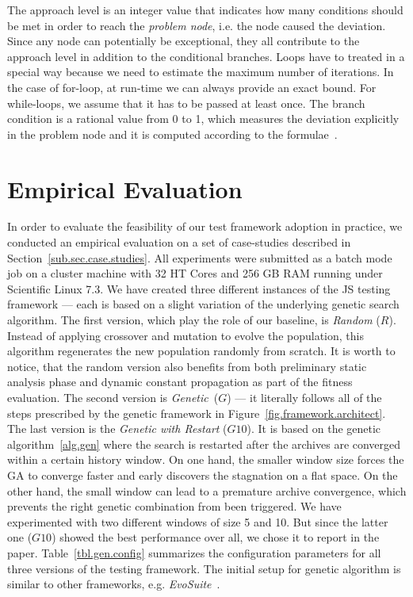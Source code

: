 \documentclass[sigconf]{acmart}
\begin{document}
The approach level is an integer value that indicates how many conditions should be met in order to reach the \emph{problem node}, i.e. the node caused the deviation. Since any node can potentially be exceptional, they all contribute to the approach level in addition to the conditional branches. Loops have to treated in a special way because we need to estimate the maximum number of iterations. In the case of for-loop, at run-time we can always provide an exact bound. For while-loops, we assume that it has to be passed at least once. The branch condition is a rational value from 0 to 1, which measures the deviation explicitly in the problem node and it is computed according to the formulae~\cite{tracey1998automated}.
 
\section{Empirical Evaluation}
\label{sec.evaluation}

In order to evaluate the feasibility of our test framework adoption in practice, we conducted an empirical evaluation on a set of case-studies described in Section~\ref{sub.sec.case.studies}. All experiments were submitted as a batch mode job on a cluster machine with 32 HT Cores and 256 GB RAM running under Scientific Linux 7.3. We have created three different instances of the JS testing framework --- each is based on a slight variation of the underlying genetic search algorithm. The first version, which play the role of our baseline, is \emph{Random} ($R$). Instead of applying crossover and mutation to evolve the population, this algorithm regenerates the new population randomly from scratch. It is worth to notice, that the random version also benefits from both preliminary static analysis phase and dynamic constant propagation as part of the fitness evaluation. The second version is \emph{Genetic}~($G$) --- it literally follows all of the steps prescribed by the genetic framework in Figure~\ref{fig.framework.architect}. The last version is the \emph{Genetic with Restart} ($G10$). It is based on the genetic algorithm~\ref{alg.gen} where the search is restarted after the archives are converged within a certain history window. On one hand, the smaller window size forces the GA to converge faster and early discovers the stagnation on a flat space. On the other hand, the small window can lead to a premature archive convergence, which prevents the right genetic combination from been triggered. We have experimented with two different windows of size 5 and 10. But since the latter one ($G10$) showed the best performance over all, we chose it to report in the paper. Table~\ref{tbl.gen.config} summarizes the configuration parameters for all three versions of the testing framework. The initial setup for genetic algorithm is similar to other frameworks, e.g. \emph{EvoSuite}~\cite{evosuite}. 
\end{document}

